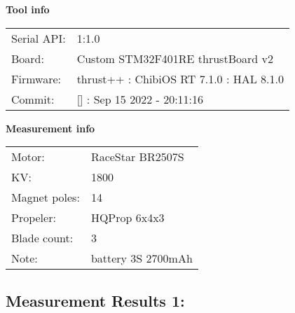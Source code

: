 \documentclass[10pt]{article}
\begin{document}
\noindent
{\large \bf Tool info}
\vspace{3mm}

\noindent
\begin{tabular}{ll}
Serial API:  & 1:1.0\\ 
Board:       & Custom STM32F401RE thrustBoard v2\\ 
Firmware:    & thrust++ : ChibiOS RT 7.1.0 : HAL 8.1.0\\ 
Commit:      & [] : Sep 15 2022 - 20:11:16
\end{tabular}
\vspace{3mm}

\noindent
{\large \bf Measurement info}
\vspace{3mm}

\noindent
\begin{tabular}{ll}
Motor:        & RaceStar BR2507S\\ 
KV:           & 1800\\ 
Magnet poles: & 14\\ 
Propeler:     & HQProp 6x4x3\\ 
Blade count:  & 3\\ 
Note:         & battery 3S 2700mAh
\end{tabular}

\vspace{3mm}


\subsection*{\large \bf Measurement Results 1:}
\end{document}
